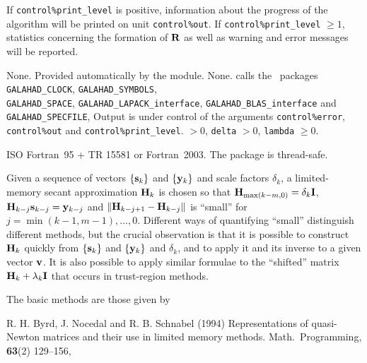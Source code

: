 \documentclass{galahad}
\newcommand{\packagename}{LMS}
\begin{document}

\galinfo
If {\tt control\%print\_level} is positive, information about the progress
of the algorithm will be printed on unit {\tt control\-\%out}.
If {\tt control\%print\_level} $\geq 1$, statistics concerning the
formation of ${\mathbf{R}}$
as well as warning and error messages will be reported.


\galgeneral

\galcommon None.
\galworkspace Provided automatically by the module.
\galroutines None.
\galmodules {\tt \packagename} calls the \galahad\ packages
{\tt GALAHAD\_CLOCK},
{\tt GALAHAD\_SY\-M\-BOLS}, \\
{\tt GALAHAD\-\_SPACE},
{\tt GALAHAD\_LAPACK\_interface},
{\tt GALAHAD\_BLAS\_interface} and
{\tt GALAHAD\_SPECFILE},
\galio Output is under control of the arguments
 {\tt control\%error}, {\tt control\%out} and {\tt control\%print\_level}.
 $> 0$, {\tt delta} $> 0$, {\tt lambda} $\geq 0$.

\galportability ISO Fortran~95 + TR 15581 or Fortran~2003.
The package is thread-safe.



\galmethod

Given a sequence of vectors $\{{\mathbf{s}}_k\}$ and $\{{\mathbf{y}}_k\}$ and scale factors
$\delta_k$, a limited-memory secant approximation ${\mathbf{H}}_k$ is chosen so that
${\mathbf{H}}_{\max(k-m,0)} = \delta_k {\mathbf{I}}$, ${\mathbf{H}}_{k-j} {\mathbf{s}}_{k-j} = {\mathbf{y}}_{k-j}$
and $\| {\mathbf{H}}_{k-j+1} - {\mathbf{H}}_{k-j}\|$ is ``small'' for
$j = \min(k-1,m-1), \ldots, 0$.
Different ways of quantifying ``small'' distinguish different methods,
but the crucial
observation is that it is possible to construct ${\mathbf{H}}_k$ quickly from
$\{{\mathbf{s}}_k\}$ and $\{{\mathbf{y}}_k\}$ and $\delta_k$, and to apply it and its inverse
to a given vector ${\mathbf{v}}$. It is also possible to apply similar formulae
to the ``shifted'' matrix ${\mathbf{H}}_k + \lambda_k {\mathbf{I}}$ that occurs in
trust-region methods.

\noindent
The basic methods are those given by
\vspace*{1mm}

\noindent
R. H. Byrd, J. Nocedal and R. B. Schnabel (1994)
Representations of quasi-Newton matrices and their use in
limited memory methods.
Math.\ Programming,  {\bf 63}(2) 129--156,
\vspace*{1mm}
\end{document}
